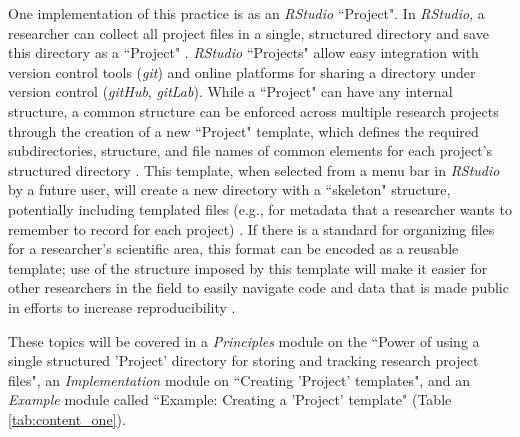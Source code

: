 \documentclass[pdftex,english,11.5pt,parskip=half]{scrartcl}
\begin{document}
One implementation of this practice is as an \textit{RStudio} ``Project". In \textit{RStudio}, a researcher can collect all project files in a single, structured directory and save this directory as a ``Project" \cite{rstudiousingprojects}. \textit{RStudio} ``Projects" allow easy integration with version control tools (\textit{git}) and online platforms for sharing a directory under version control (\textit{gitHub}, \textit{gitLab}). 
While a ``Project" can have any internal
structure, a common structure can be enforced across multiple research projects
through the creation of a new ``Project" template, which defines the required
subdirectories, structure, and file names of common elements for each project's structured directory \cite{rstudioprojecttemplate}. This template, when selected from a menu bar  in \textit{RStudio} by a
future user, will create a new directory with a ``skeleton" structure,
potentially including templated files (e.g., for metadata that a researcher wants to remember to record for each project) \cite{rstudioprojecttemplate}. If there is a standard for organizing files for a researcher's scientific area, this format can be encoded as a reusable template; use of the structure imposed by this template will make it easier for other researchers in the field to easily navigate code and data that is made public in efforts to increase reproducibility \cite{marwick2018packaging}. 

These topics will be
covered in a \textit{Principles} module on the ``Power of using a single
structured 'Project' directory for storing and tracking research project files",
an \textit{Implementation} module on ``Creating 'Project' templates", and an
\textit{Example} module called ``Example: Creating a 'Project' template" (Table \ref*{tab:content_one}).
\end{document}
